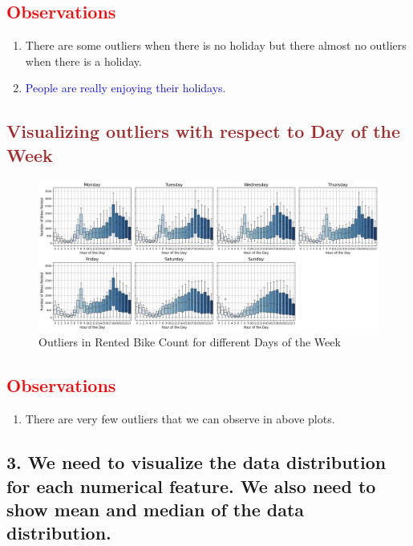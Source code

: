 \documentclass[12pt, letterpaper]{article}
\begin{document}
\subsection*{\textcolor{red}{Observations}}
\begin{enumerate}
  \item There are some outliers when there is no holiday but there almost no outliers when there is a holiday.
  \item \textcolor{blue}{People are really enjoying their holidays.}
\end{enumerate}

\newpage

\subsection*{\textcolor{brown}{Visualizing outliers with respect to Day of the Week}}
\begin{figure}[h]
  \centering
  \includegraphics[width=1\textwidth]{weekday2.png}
  \caption{Outliers in Rented Bike Count for different Days of the Week}
\end{figure}

\subsection*{\textcolor{red}{Observations}}
\begin{enumerate}
  \item There are very few outliers that we can observe in above plots.
\end{enumerate}

\subsection*{3. We need to visualize the data distribution for each numerical feature. We also need to show mean and median of the data distribution.}
\end{document}
